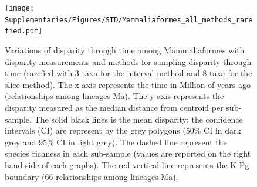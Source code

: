 \begin{landscape}
\begin{figure}[!htbp]
\centering
    \texttt{[image: Supplementaries/Figures/STD/Mammaliaformes\_all\_methods\_rarefied.pdf]}
\caption[Comparison of all the disparity metrics and all the time series methods for Mammaliaformes (rarefied)]{Variations of disparity through time among Mammaliaformes with disparity measurements and methods for sampling disparity through time (rarefied with 3 taxa for the interval method and 8 taxa for the slice method). The x axis represents the time in Million of years ago (relationships among lineages
Ma). The y axis represents the disparity measured as the median distance from centroid per sub-sample. The solid black lines is the mean disparity; the confidence intervals (CI) are represent by the grey polygons (50\% CI in dark grey and 95\% CI in light grey). The dashed line represent the species richness in each sub-sample (values are reported on the right hand side of each graphs). The red vertical line represents the K-Pg boundary (66 relationships among lineages
Ma).}
\label{Supp_disparity_all_Mammaliaformes_rarefied}
\end{figure}
\end{landscape}

